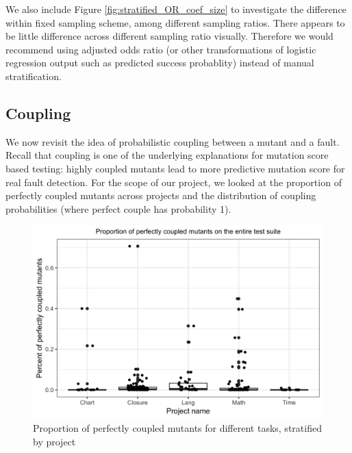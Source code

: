 \documentclass[10pt,letterpaper]{article}
\begin{document}
We also include Figure \ref{fig:stratified_OR_coef_size} to investigate the difference within fixed sampling scheme, among different sampling ratios. There appears to be little difference across different sampling ratio visually. Therefore we would recommend using adjusted odds ratio (or other transformations of logistic regression output such as predicted success probablity) instead of manual stratification.

    
\subsection{Coupling}

We now revisit the idea of probabilistic coupling between a mutant and a fault. Recall that coupling is one of the underlying explanations for mutation score based testing: highly coupled mutants lead to more predictive mutation score for real fault detection. For the scope of our project, we looked at the proportion of perfectly coupled mutants across projects and the distribution of coupling probabilities (where perfect couple has probability 1).  

  \begin{figure}[ht!]
        \centering
        \includegraphics[scale=0.1]{figures/perfect_coupling_prop_box.png}
        \caption{Proportion of perfectly coupled mutants for different tasks, stratified by project }
        \label{fig:perfect_coupling_prop_box}
    \end{figure}
    
\end{document}
